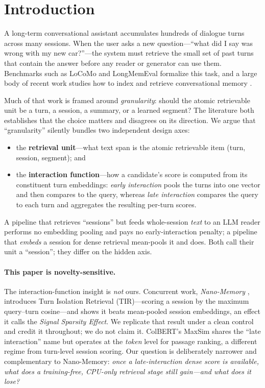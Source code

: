 \documentclass[10pt,twocolumn]{article}
\begin{document}
\section{Introduction}
A long-term conversational assistant accumulates hundreds of dialogue turns
across many sessions. When the user asks a new question---``what did I say was
wrong with my new car?''---the system must retrieve the small set of past
turns that contain the answer before any reader or generator can use them.
Benchmarks such as LoCoMo \citep{locomo} and LongMemEval \citep{longmemeval}
formalize this task, and a large body of recent work studies how to index and
retrieve conversational memory \citep{secom,memgpt,zep}.

Much of that work is framed around \emph{granularity}: should the atomic
retrievable unit be a turn, a session, a summary, or a learned segment? The
literature both establishes that the choice matters and disagrees on its
direction. We argue that ``granularity'' silently bundles two independent
design axes:
\begin{itemize}\itemsep1pt
  \item the \textbf{retrieval unit}---what text span is the atomic retrievable
  item (turn, session, segment); and
  \item the \textbf{interaction function}---how a candidate's score is
  computed from its constituent turn embeddings: \emph{early interaction}
  pools the turns into one vector and then compares to the query, whereas
  \emph{late interaction} compares the query to each turn and aggregates the
  resulting per-turn scores.
\end{itemize}
A pipeline that retrieves ``sessions'' but feeds whole-session \emph{text} to
an LLM reader performs no embedding pooling and pays no early-interaction
penalty; a pipeline that \emph{embeds} a session for dense retrieval
mean-pools it and does. Both call their unit a ``session''; they differ on the
hidden axis.

\paragraph{This paper is novelty-sensitive.}
The interaction-function insight is \emph{not} ours. Concurrent work,
\emph{Nano-Memory} \citep{nanomemory}, introduces Turn Isolation Retrieval
(TIR)---scoring a session by the maximum query--turn cosine---and shows it
beats mean-pooled session embeddings, an effect it calls the \emph{Signal
Sparsity Effect}. We replicate that result under a clean control and credit it
throughout; we do not claim it. ColBERT's MaxSim \citep{colbert} shares the
``late interaction'' name but operates at the \emph{token} level for passage
ranking, a different regime from turn-level session scoring. Our question is
deliberately narrower and complementary to Nano-Memory: \emph{once a
late-interaction dense score is available, what does a training-free,
CPU-only retrieval stage still gain---and what does it lose?}
\end{document}
